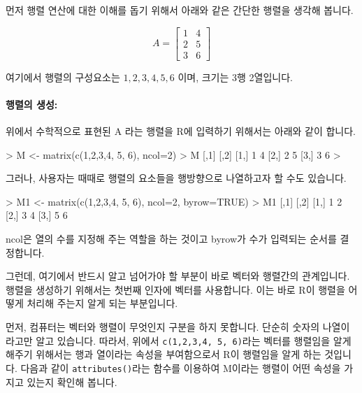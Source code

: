 \documentclass[tutorial.tex]{subfiles}
\begin{document}
먼저 행렬 연산에 대한 이해를 돕기 위해서 아래와 같은 간단한 행렬을 생각해 봅니다. 

\begin{equation}
A = 
\begin{bmatrix}
1 & 4 \\
2 & 5 \\
3 & 6
\end{bmatrix}
\end{equation}

여기에서 행렬의 구성요소는 $1,2,3,4, 5, 6$ 이며, 크기는 3행 2열입니다.

\paragraph{행렬의 생성:} 위에서 수학적으로 표현된 A 라는 행렬을 R에 입력하기 위해서는 아래와 같이 합니다. 

\begin{Schunk}
\begin{Soutput}
> M <- matrix(c(1,2,3,4, 5, 6), ncol=2)
> M
     [,1] [,2]
[1,]    1    4
[2,]    2    5
[3,]    3    6
>
\end{Soutput}
\end{Schunk}

그러나, 사용자는 때때로 행렬의 요소들을 행방향으로 나열하고자 할 수도 있습니다. 
\begin{Schunk}
\begin{Soutput}
> M1 <- matrix(c(1,2,3,4, 5, 6), ncol=2, byrow=TRUE)
> M1
     [,1] [,2]
[1,]    1    2
[2,]    3    4
[3,]    5    6

\end{Soutput}
\end{Schunk}

ncol은 열의 수를 지정해 주는 역할을 하는 것이고 byrow가 수가 입력되는 순서를 결정합니다.

그런데, 여기에서 반드시 알고 넘어가야 할 부분이 바로 벡터와 행렬간의 관계입니다. 
행렬을 생성하기 위해서는 첫번째 인자에 벡터를 사용합니다. 
이는 바로 R이 행렬을 어떻게 처리해 주는지 알게 되는 부분입니다. 

먼저, 컴퓨터는 벡터와 행렬이 무엇인지 구분을 하지 못합니다. 
단순히 숫자의 나열이라고만 알고 있습니다. 
따라서, 위에서 \texttt{c(1,2,3,4, 5, 6)}라는 벡터를 행렬임을 알게 해주기 위해서는 행과 열이라는 속성을 부여함으로서 
R이 행렬임을 알게 하는 것입니다.
다음과 같이 \texttt{attributes()}라는 함수를 이용하여 M이라는 행렬이 어떤 속성을 가지고 있는지 확인해 봅니다. 

\begin{Schunk}
\end{Schunk}
\end{document}

